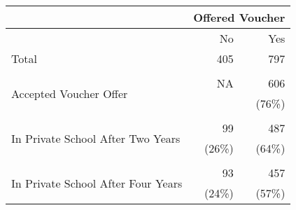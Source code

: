 \begin{tabular}{lrr}
\toprule
	&	\multicolumn{2}{c}{Offered Voucher} \\
\midrule
    & No    & Yes \\\cmidrule{2-3}
Total & 405   & 797 \\
	&	&	\\
\multicolumn{1}{l}{\multirow{2}[0]{*}{Accepted Voucher Offer}} & NA    & 606 \\
\multicolumn{1}{l}{} &       & (76\%) \\
	&	&	\\
\multicolumn{1}{l}{\multirow{2}[0]{*}{In Private School After Two Years}} & 99    & 487 \\
\multicolumn{1}{l}{} & (26\%) & (64\%) \\
	&	&	\\
\multicolumn{1}{l}{\multirow{2}[0]{*}{In Private School After Four Years}} & 93    & 457 \\
\multicolumn{1}{l}{} & (24\%) & (57\%) \\
\bottomrule
\end{tabular}